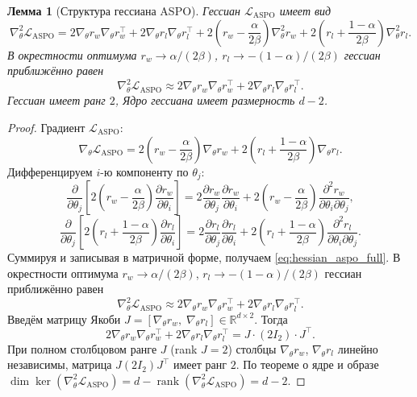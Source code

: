 \documentclass[a4paper,12pt]{article}
\newtheorem{lemma}{Лемма}
\begin{document}
\begin{lemma}[Структура гессиана ASPO]
\label{lem:hessian_aspo}
Гессиан $\mathcal{L}_{\text{ASPO}}$ имеет вид
\begin{equation}
\nabla_\theta^2 \mathcal{L}_{\text{ASPO}} = 2 \nabla_\theta r_w \nabla_\theta r_w^\top + 2 \nabla_\theta r_l \nabla_\theta r_l^\top + 2\left(r_w - \frac{\alpha}{2\beta}\right)\nabla_\theta^2 r_w + 2\left(r_l + \frac{1-\alpha}{2\beta}\right)\nabla_\theta^2 r_l.
\label{eq:hessian_aspo_full}
\end{equation}
В окрестности оптимума $r_w \to \alpha/(2\beta)$, $r_l \to -(1-\alpha)/(2\beta)$ гессиан приближённо равен
\[
\nabla_\theta^2 \mathcal{L}_{\text{ASPO}} \approx 2 \nabla_\theta r_w \nabla_\theta r_w^\top + 2 \nabla_\theta r_l \nabla_\theta r_l^\top.
\]
Гессиан имеет ранг $2$, Ядро гессиана имеет размерность $d-2$.
\end{lemma}

\begin{proof}
Градиент $\mathcal{L}_{\text{ASPO}}$:
\[
\nabla_\theta \mathcal{L}_{\text{ASPO}} = 2\left(r_w - \frac{\alpha}{2\beta}\right)\nabla_\theta r_w + 2\left(r_l + \frac{1-\alpha}{2\beta}\right)\nabla_\theta r_l.
\]
Дифференцируем $i$-ю компоненту по $\theta_j$:
\[
\frac{\partial}{\partial \theta_j} \left[ 2\left(r_w - \frac{\alpha}{2\beta}\right) \frac{\partial r_w}{\partial \theta_i} \right]
= 2 \frac{\partial r_w}{\partial \theta_j} \frac{\partial r_w}{\partial \theta_i} + 2\left(r_w - \frac{\alpha}{2\beta}\right) \frac{\partial^2 r_w}{\partial \theta_i \partial \theta_j},
\]
\[
\frac{\partial}{\partial \theta_j} \left[ 2\left(r_l + \frac{1-\alpha}{2\beta}\right) \frac{\partial r_l}{\partial \theta_i} \right]
= 2 \frac{\partial r_l}{\partial \theta_j} \frac{\partial r_l}{\partial \theta_i} + 2\left(r_l + \frac{1-\alpha}{2\beta}\right) \frac{\partial^2 r_l}{\partial \theta_i \partial \theta_j}.
\]
Суммируя и записывая в матричной форме, получаем \eqref{eq:hessian_aspo_full}. 
В окрестности оптимума $r_w \to \alpha/(2\beta)$, $r_l \to -(1-\alpha)/(2\beta)$ гессиан приближённо равен
\[
\nabla_\theta^2 \mathcal{L}_{\text{ASPO}} \approx 2 \nabla_\theta r_w \nabla_\theta r_w^\top + 2 \nabla_\theta r_l \nabla_\theta r_l^\top.
\]
Введём матрицу Якоби $J = [\nabla_\theta r_w,\; \nabla_\theta r_l] \in \mathbb{R}^{d \times 2}$. Тогда
\[
2 \nabla_\theta r_w \nabla_\theta r_w^\top + 2 \nabla_\theta r_l \nabla_\theta r_l^\top = J \cdot (2I_2) \cdot J^\top.
\]
При полном столбцовом ранге $J$ (rank $J = 2$) столбцы $\nabla_\theta r_w$, $\nabla_\theta r_l$ линейно независимы, матрица $J(2I_2)J^\top$ имеет ранг $2$. По теореме о ядре и образе $\dim \ker(\nabla_\theta^2 \mathcal{L}_{\text{ASPO}}) = d - \operatorname{rank} (\nabla_\theta^2 \mathcal{L}_{\text{ASPO}} )= d - 2$.
\end{proof}
\end{document}
